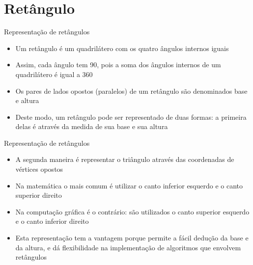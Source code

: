\section{Retângulo}

\begin{frame}[fragile]{Representação de retângulos}

    \begin{itemize}
        \item Um retângulo é um quadrilátero com os quatro ângulos internos iguais 

        \item Assim, cada ângulo tem 90\textdegree, pois a soma dos ângulos internos de um 
            quadrilátero é igual a 360\textdegree

        \item Os pares de lados opostos (paralelos) de um retângulo são denominados base e
            altura

        \item Deste modo, um retângulo pode ser representado de duas formas: a primeira delas é 
            através da medida de sua base e sua altura
    \end{itemize}


\end{frame}

\begin{frame}[fragile]{Representação de retângulos}

    \begin{itemize}
        \item A segunda maneira é representar o triângulo através das coordenadas de 
            vértices opostos

        \item Na matemática o mais comum é utilizar o canto inferior esquerdo e o canto superior 
            direito

        \item Na computação gráfica é o contrário: são utilizados o canto superior esquerdo e o 
            canto inferior direito

        \item Esta representação tem a vantagem porque permite a fácil dedução da base e da 
            altura, e dá flexibilidade na implementação de algoritmos que envolvem retângulos

    \end{itemize}

\end{frame}

